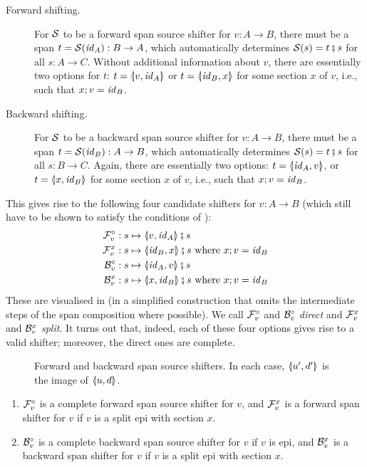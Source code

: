 \begin{description}
\item[Forward shifting.] For $\cS$ to be a forward span source shifter for $v:A\to B$, there must be a span $t=\cS(\id_A):B\to A$, which automatically determines $\cS(s)=t\spcomp s$ for all $s:A\to C$. Without additional information about $v$, there are essentially two options for $t$: $t=\spanof{v}{\id_A}$ or $t=\spanof{\id_B}{x}$ for some section $x$ of $v$, i.e., such that $x;v=\id_B$.

\item[Backward shifting.] For $\cS$ to be a backward span source shifter for $v:A\to B$, there must be a span $t=\cS(\id_B):A\to B$, which automatically determines $\cS(s)=t \spcomp s$ for all $s:B\to C$. Again, there are essentially two options: $t=\spanof{\id_A}{v}$, or $t=\spanof{x}{\id_B}$ for some section $x$ of $v$, i.e., such that $x;v=\id_B$.
\end{description}
%
This gives rise to the following four candidate shifters for $v:A\to B$ (which still have to be shown to satisfy the conditions of ):
%
\begin{align*}
\dF v & : s \mapsto \spanof{v}{\id_A}\spcomp s \\
\rF v x& : s \mapsto \spanof{\id_B}{x}\spcomp s \text{ where $x;v=\id_B$} \\
\dB v& : s \mapsto \spanof{\id_A}{v}\spcomp s \\
\rB v x& : s \mapsto \spanof{x}{\id_B}\spcomp s \text{ where $x;v=\id_B$}
\end{align*}
%
These are visualised in  (in a simplified construction that omits the intermediate steps of the span composition where possible). We call $\dF v$ and $\dB v$ \emph{direct} and $\rF v x$ and $\rB v x$ \emph{split}. It turns out that, indeed, each of these four options gives rise to a valid shifter; moreover, the direct ones are complete.
%
\begin{figure}[t]
\centering

\caption{Forward and backward span source shifters. In each case, $\spanof{u'}{d'}$ is the image of $\spanof{u}{d}$.}
\end{figure}
%
\begin{proposition}
\begin{enumerate}[topsep=\smallskipamount]
\item $\cF_v^\circ$ is a complete forward span source shifter for $v$, and $\cF_v^x$ is a forward span shifter for $v$ if $v$ is a split epi with section $x$.
\item $\cB_v^\circ$ is a complete backward span source shifter for $v$ if $v$ is epi, and $\cB_v^x$ is a backward span shifter for $v$ if $v$ is a split epi with section $x$.
\end{enumerate}
\end{proposition}
